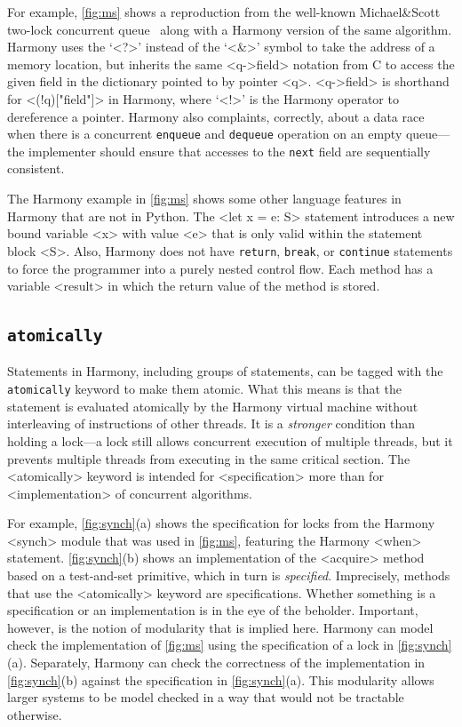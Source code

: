 \documentclass[twocolumn]{article}
\begin{document}
For example, \autoref{fig:ms} shows a reproduction from the well-known
Michael\&Scott two-lock concurrent queue~\cite{MS96} along with a
Harmony version of the same algorithm.
Harmony uses the `<{?}>' instead of the `<{&}>' symbol to take the address
of a memory location, but inherits the same <{q->field}> notation
from C to access the given field in the dictionary pointed to by
pointer <{q}>.  <{q->field}> is shorthand for <{(!q)["field"]}> in
Harmony, where `<{!}>' is the Harmony operator to dereference a pointer.
Harmony also complaints, correctly, about a data race when
there is a concurrent \texttt{enqueue} and \texttt{dequeue} operation
on an empty queue---the implementer should ensure that accesses to the
\texttt{next} field are sequentially consistent.

The Harmony example in \autoref{fig:ms} shows some other language
features in Harmony that are not in Python.
The <{let x = e: S}> statement introduces a new bound variable <{x}>
with value <{e}> that is only valid within the statement block <{S}>.
Also, Harmony does not have \texttt{return}, \texttt{break}, or
\texttt{continue} statements to force the programmer into a purely
nested control flow.  Each method has a variable <{result}> in which
the return value of the method is stored.

\subsection{\texttt{atomically}}

Statements in Harmony, including groups of statements, can be tagged with
the \texttt{atomically} keyword to make them atomic.  What this means
is that the statement is evaluated atomically by the Harmony virtual
machine without interleaving of instructions of other threads.  It is
a \emph{stronger} condition than holding a lock---a lock still allows
concurrent execution of multiple threads, but it prevents multiple
threads from executing in the same critical section.
The <{atomically}> keyword is intended for <{specification}> more than
for <{implementation}> of concurrent algorithms.

For example, \autoref{fig:synch}(a) shows the specification for locks
from the Harmony <{synch}> module that was used in \autoref{fig:ms},
featuring the Harmony <{when}> statement.
\autoref{fig:synch}(b) shows an implementation of the <{acquire}>
method based on a test-and-set primitive, which in turn is
\emph{specified}.
Imprecisely, methods that use the <{atomically}> keyword are specifications.
Whether something is a specification or an implementation is in the
eye of the beholder.
Important, however, is the notion of modularity that is implied here.
Harmony can model check the implementation of \autoref{fig:ms} using
the specification of a lock in \autoref{fig:synch}(a).
Separately, Harmony can check the correctness of the implementation in
\autoref{fig:synch}(b) against the specification in
\autoref{fig:synch}(a).  This modularity allows larger systems to
be model checked in a way that would not be tractable otherwise.
\end{document}
